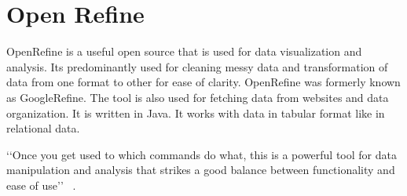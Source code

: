 \section{Open Refine}

OpenRefine is a useful open source that is used for data visualization
and analysis.  Its predominantly used for cleaning messy data and
transformation of data from one format to other for ease of clarity.
OpenRefine was formerly known as GoogleRefine. The tool is also used
for fetching data from websites and data organization.
It is written in Java. It works with data in tabular format like in
relational data.

‘‘Once you get used to which commands do what, this is a powerful tool
for data manipulation and analysis that strikes a good balance between
functionality and ease of use’’ ~\cite{hid-sp18-417-openrefine}.


